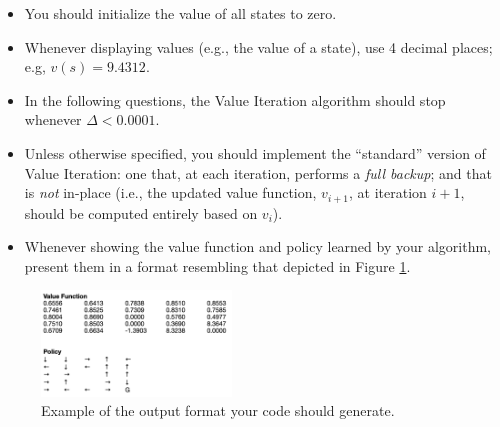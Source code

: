\documentclass{article}
\begin{document}
\begin{itemize}
    \item You should initialize the value of all states to zero. 
    \item Whenever displaying values (e.g., the value of a state), use 4 decimal places; e.g, $v(s)=9.4312$.
    \item In the following questions, the Value Iteration algorithm should stop whenever $\Delta < 0.0001$.
    \item Unless otherwise specified, you should implement the ``standard'' version of Value Iteration: one that, at each iteration, performs a \textit{full backup}; and that is \textit{not} in-place (i.e., the updated value function, $v_{i+1}$, at iteration $i+1$, should be computed entirely based on $v_i$).
    \item Whenever showing the value function and policy learned by your algorithm, present them in a format resembling that depicted in Figure \ref{fig:output_format}.
\end{itemize}


\begin{figure}[!ht]
    \centering
    \includegraphics[width=0.45\textwidth]{HW_figs/output_format.png}
    \caption{Example of the output format your code should generate.}
    \label{fig:output_format}
\end{figure}
\end{document}
